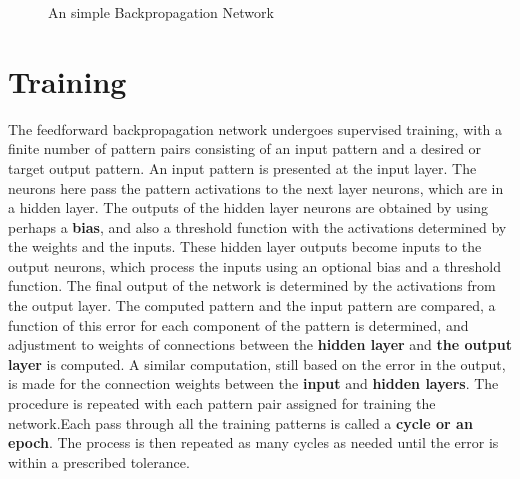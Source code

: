 \documentclass[12pt, right open]{memoir}
\begin{document}
\def\layersep{2.5cm}
\begin{figure}[ht!]
\caption{An simple Backpropagation Network} 
\label{fig:simple_backpropagation}
\centering
{}
\end{figure}

\section{Training}

The feedforward backpropagation network undergoes supervised training, with
a finite number of pattern pairs consisting of an input pattern and a desired or
target output pattern. An input pattern is presented at the input layer. The
neurons here pass the pattern activations to the next layer neurons, which are
in a hidden layer. The outputs of the hidden layer neurons are obtained by
using perhaps a \textbf{bias}, and also a threshold function with the activations
determined by the weights and the inputs. These hidden layer outputs become
inputs to the output neurons, which process the inputs using an optional bias
and a threshold function. The final output of the network is determined by the
activations from the output layer.
The computed pattern and the input pattern are compared, a function of this
error for each component of the pattern is determined, and adjustment to
weights of connections between the \textbf{hidden layer} and \textbf{the output layer} is
computed. A similar computation, still based on the error in the output, is
made for the connection weights between the \textbf{input} and \textbf{hidden layers}. The
procedure is repeated with each pattern pair assigned for training the network.Each pass through all the training patterns is called a \textbf{cycle or an epoch}. The
process is then repeated as many cycles as needed until the error is within a
prescribed tolerance.
\end{document}
